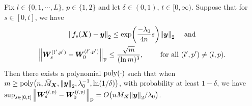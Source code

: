 \begin{lemma}
  \label{lem:A_lazy_W}
  Fix $l \in \{0,1,\cdots,L\}$, $p \in \{1,2\}$ and let $\delta\in(0,1)$, $t\in[0,\infty)$.
  Suppose that for $s \in [0,t]$, we have
  \begin{align*}
    \begin{gathered}
      \norm{f_s(\bm{X})-\bm{y}}_2 \leq \exp(\frac{-\lambda_0 }{4n}s) \norm{\bm{y}}_2\quad~\text{and}\\
      \norm{ \bm{W}^{(l',p')}_s - \bm{W}^{(l',p')}_0 }_{\mathrm{F}} \leq \frac{\sqrt{m}}{(\ln m)^3},\qquad~\text{for all}~(l',p') \neq (l,p).
    \end{gathered}
  \end{align*}
  Then there exists a polynomial $\mathrm{poly}(\cdot)$ such that when $m\geq\poly\xkm{n, \tilde{M}_{\bm{X}}, \norm{\bm{y}}_2,\lambda_0^{-1},\ln(1/\delta)}$,
  with probability at least $1-\delta$, we have
  $\sup_{s\in[0,t]}\norm{\bm{W}^{(l,p)}_s-\bm{W}^{(l,p)}_0 }_{\mr{F}} = O\xkm{{n \tilde{M}_{\bm{X}}\norm{\bm{y}}_2}/{\lambda_0}}$.
\end{lemma}

